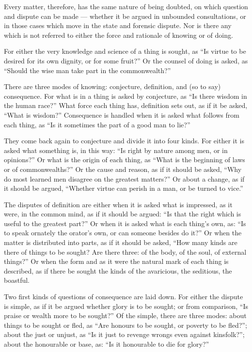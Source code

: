  Every matter, therefore, has the same nature of being doubted, on which question and dispute can be made — whether it be argued in unbounded consultations, or in those cases which move in the state and forensic dispute. Nor is there any which is not referred to either the force and rationale of knowing or of doing.

 For either the very knowledge and science of a thing is sought, as ``Is virtue to be desired for its own dignity, or for some fruit?'' Or the counsel of doing is asked, as ``Should the wise man take part in the commonwealth?''

 There are three modes of knowing: conjecture, definition, and (so to say) consequence. For what is in a thing is asked by conjecture, as ``Is there wisdom in the human race?'' What force each thing has, definition sets out, as if it be asked, ``What is wisdom?'' Consequence is handled when it is asked what follows from each thing, as ``Is it sometimes the part of a good man to lie?''

 They come back again to conjecture and divide it into four kinds. For either it is asked what something is, in this way: ``Is right by nature among men, or in opinions?'' Or what is the origin of each thing, as ``What is the beginning of laws or of commonwealths?'' Or the cause and reason, as if it should be asked, ``Why do most learned men disagree on the greatest matters?'' Or about a change, as if it should be argued, ``Whether virtue can perish in a man, or be turned to vice.''

 The disputes of definition are either when it is asked what is impressed, as it were, in the common mind, as if it should be argued: ``Is that the right which is useful to the greatest part?'' Or when it is asked what is each thing's own, as: ``Is to speak ornately the orator's own, or can someone besides do it?'' Or when the matter is distributed into parts, as if it should be asked, ``How many kinds are there of things to be sought? Are there three: of the body, of the soul, of external things?'' Or when the form and as it were the natural mark of each thing is described, as if there be sought the kinds of the avaricious, the seditious, the boastful.

 Two first kinds of questions of consequence are laid down. For either the dispute is simple, as if it be argued whether glory is to be sought; or from comparison, ``Is praise or wealth more to be sought?'' Of the simple, there are three modes: about things to be sought or fled, as ``Are honours to be sought, or poverty to be fled?''; about the just or unjust, as ``Is it just to revenge wrongs even against kinsfolk?''; about the honourable or base, as: ``Is it honourable to die for glory?''


